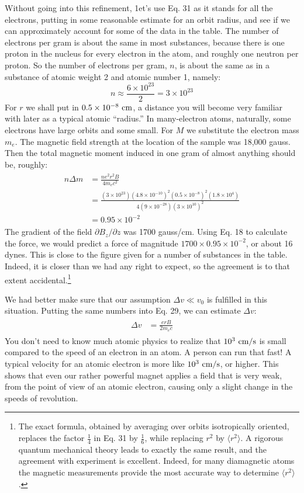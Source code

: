 Without going into this refinement, 1et's use Eq. 31 as it stands
for all the electrons, putting in some reasonable estimate for an orbit
radius, and see if we can approximately account for some of the data
in the table. The number of electrons per gram is about the same
in most substances, because there is one proton in the nucleus for
every electron in the atom, and roughly one neutron per proton. So
the number of electrons per gram, $n$, is about the same as in a substance
of atomic weight 2 and atomic number 1, namely:
\begin{equation}
  n \approx \frac{6\times10^{23}}{2} = 3\times10^{23}
\end{equation}
For $r$ we shall put in $0.5 \times 10^{-8}\ \cmunit$, a distance you will become very
familiar with later as a typical atomic ``radius.'' In many-electron
atoms, naturally, some electrons have large orbits and some small.
For $M$ we substitute the electron mass $m_e$. The magnetic field
strength at the location of the sample was 18,000 gauss. Then the
total magnetic moment induced in one gram of almost anything
should be, roughly:
\begin{align}
\begin{split}
  n\Delta m &= \frac{ne^2r^2B}{4m_ec^2} \\
      &= \frac{(3\times10^{23})(4.8\times10^{-10})^2(0.5\times10^{-8})^2(1.8\times10^4)}
              {4(9\times10^{-28})(3\times10^{10})^2} \\
      &= 0.95\times10^{-2}
\end{split}
\end{align}
The gradient of the field $\partial B_z/\partial z$ was 1700 gauss/cm. Using Eq. 18
to calculate the force, we would predict a force of magnitude
$1700 \times 0.95 \times 10^{-2}$, or about 16 dynes. This is close to the figure
given for a number of substances in the table. Indeed, it is closer
than we had any right to expect, so the agreement is to that extent
accidental.\footnote{The exact formula, obtained by averaging over orbits isotropically oriented, replaces
the factor $\frac{1}{4}$ in Eq. 31 by $\frac{1}{6}$, while replacing $r^2$ by $\langle r^2 \rangle$.
A rigorous quantum
mechanical theory leads to exactly the same result, and the agreement with 
experiment is excellent. Indeed, for many diamagnetic atoms the magnetic measurements
provide the most accurate way to determine $\langle r^2 \rangle$.
}

We had better make sure that our assumption $\Delta v\ll v_0$ is fulfilled
in this situation. Putting the same numbers into Eq. 29, we can
estimate $\Delta v$:
\begin{align}
\begin{split}
  \Delta v &= \frac{erB}{2m_ec}
\end{split}
\end{align}
You don't need to know much atomic physics to realize that
$10^3\ \cmunit/\sunit$ is small compared to the speed of an electron in an atom.
A person can run that fast! A typical velocity for an atomic electron
is more like $10^3\ \cmunit/\sunit$, or higher. This shows that even our rather
powerful magnet applies a field that is very weak, from the point of
view of an atomic electron, causing only a slight change in the speeds
of revolution.

